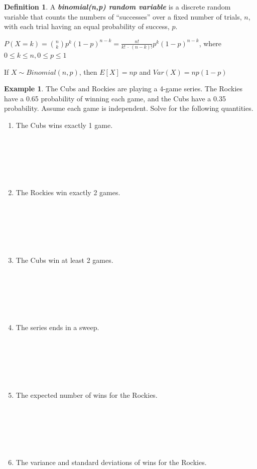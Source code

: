 \documentclass[
  11pt,
]{book}
\theoremstyle{definition}
\newtheorem{definition}{Definition}[chapter]
\theoremstyle{definition}
\newtheorem{example}{Example}[chapter]
\theoremstyle{definition}
\theoremstyle{definition}
\theoremstyle{remark}
\begin{document}
\begin{definition}
A \textbf{\emph{binomial(n,p) random variable}} is a discrete random variable that counts the numbers of ``successes'' over a fixed number of trials, \(n\), with each trial having an equal probability of success, \(p\).

\(P(X=k) = \binom{n}{k} p^k(1-p)^{n-k} = \frac{n!}{k!\ \cdot\ (n-k)!} p^k(1-p)^{n-k}\), where \(0 \leq k \leq n, 0 \leq p \leq 1\)

If \(X \sim Binomial(n,p)\), then \(E[X]=np\) and \(Var(X)=np(1-p)\)
\end{definition}

\begin{example}
The Cubs and Rockies are playing a 4-game series. The Rockies have a 0.65 probability of winning each game, and the Cubs have a 0.35 probability. Assume each game is independent. Solve for the following quantities.
\end{example}

\begin{enumerate}
\def\labelenumi{(\alph{enumi})}
\item
  The Cubs wins exactly 1 game.\\
  \strut \\
  \strut \\
  \strut \\
\item
  The Rockies win exactly 2 games.\\
  \strut \\
  \strut \\
  \strut \\
\item
  The Cubs win at least 2 games.\\
  \strut \\
  \strut \\
  \strut \\
\item
  The series ends in a sweep.\\
  \strut \\
  \strut \\
  \strut \\
\item
  The expected number of wins for the Rockies.\\
  \strut \\
  \strut \\
  \strut \\
\item
  The variance and standard deviations of wins for the Rockies.\\
  \strut \\
  \strut \\
  \strut \\
\end{enumerate}
\end{document}

